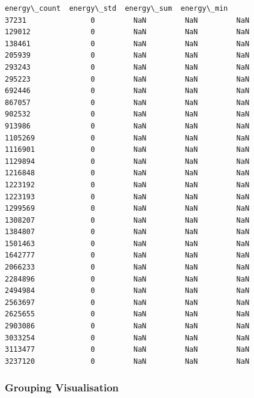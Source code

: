 \documentclass[11pt]{article}
\begin{document}
\begin{tcolorbox}[breakable, size=fbox, boxrule=.5pt, pad at break*=1mm, opacityfill=0]
\begin{Verbatim}[commandchars=\\\{\}]
         energy\_count  energy\_std  energy\_sum  energy\_min
37231               0         NaN         NaN         NaN
129012              0         NaN         NaN         NaN
138461              0         NaN         NaN         NaN
205939              0         NaN         NaN         NaN
293243              0         NaN         NaN         NaN
295223              0         NaN         NaN         NaN
692446              0         NaN         NaN         NaN
867057              0         NaN         NaN         NaN
902532              0         NaN         NaN         NaN
913986              0         NaN         NaN         NaN
1105269             0         NaN         NaN         NaN
1116901             0         NaN         NaN         NaN
1129894             0         NaN         NaN         NaN
1216848             0         NaN         NaN         NaN
1223192             0         NaN         NaN         NaN
1223193             0         NaN         NaN         NaN
1299569             0         NaN         NaN         NaN
1308207             0         NaN         NaN         NaN
1384807             0         NaN         NaN         NaN
1501463             0         NaN         NaN         NaN
1642777             0         NaN         NaN         NaN
2066233             0         NaN         NaN         NaN
2284896             0         NaN         NaN         NaN
2494984             0         NaN         NaN         NaN
2563697             0         NaN         NaN         NaN
2625655             0         NaN         NaN         NaN
2903086             0         NaN         NaN         NaN
3033254             0         NaN         NaN         NaN
3113477             0         NaN         NaN         NaN
3237120             0         NaN         NaN         NaN
\end{Verbatim}
\end{tcolorbox}
        
    \subsubsection{Grouping Visualisation}\label{grouping-visualisation}
\end{document}
